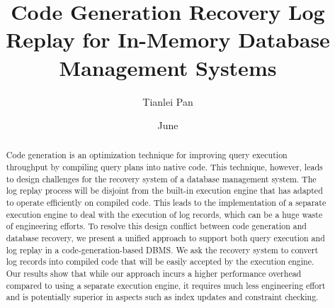 \documentclass[12pt]{cmuthesis}
\begin{document}
 
\frontmatter

\pagestyle{empty}

\title{ %
{\bf Code Generation Recovery Log Replay for In-Memory Database Management Systems}}
\author{Tianlei Pan}
\date{June}
\trnumber{}


\support{}
\disclaimer{}



\maketitle

\begin{dedication}
\end{dedication}

\pagestyle{plain} %


\begin{abstract}
Code generation is an optimization technique for improving query execution throughput by compiling query plans into native code. This technique, however, leads to design challenges for the recovery system of a database management system. The log replay process will be disjoint from the built-in execution engine that has adapted to operate efficiently on compiled code. This leads to the implementation of a separate execution engine to deal with the execution of log records, which can be a huge waste of engineering efforts. To resolve this design conflict between code generation and database recovery, we present a unified approach to support both query execution and log replay in a code-generation-based DBMS. We ask the recovery system to convert log records into compiled code that will be easily accepted by the execution engine. Our results show that while our approach incurs a higher performance overhead compared to using a separate execution engine, it requires much less engineering effort and is potentially superior in aspects such as index updates and constraint checking.
\end{abstract}
\end{document}
